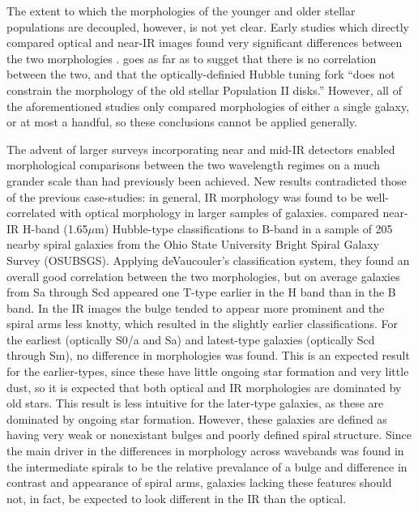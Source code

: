 The extent to which the morphologies of the younger and older stellar populations are decoupled, however, is not yet clear. Early studies which directly compared optical and near-IR images found very significant differences between the two morphologies \citep{Hackwell1983,Thronson1989,Block1991,Block1994}. \citet{Block1999} goes as far as to sugget that there is no correlation between the two, and that the optically-definied Hubble tuning fork ``does not constrain the morphology of the old stellar Population II disks.'' However, all of the aforementioned studies only compared morphologies of either a single galaxy, or at most a handful, so these conclusions cannot be applied generally.

The advent of larger surveys incorporating near and mid-IR detectors enabled morphological comparisons between the two wavelength regimes on a much grander scale than had previously been achieved. New results contradicted those of the previous case-studies: in general, IR morphology was found to be well-correlated with optical morphology in larger samples of galaxies. \citet{Eskridge2002} compared near-IR H-band (1.65$\mu$m) Hubble-type classifications to B-band in a sample of 205 nearby spiral galaxies from the Ohio State University Bright Spiral Galaxy Survey (OSUBSGS). Applying deVaucouler's classification system, they found an overall good correlation between the two morphologies, but on average galaxies from Sa through Scd appeared one T-type earlier in the H band than in the B band. In the IR images the bulge tended to appear more prominent and the spiral arms less knotty, which resulted in the slightly earlier classifications. For the earliest (optically S0/a and Sa) and latest-type galaxies (optically Scd through Sm), no difference in morphologies was found. This is an expected result for the earlier-types, since these have little ongoing star formation and very little dust, so it is expected that both optical and IR morphologies are dominated by old stars. This result is less intuitive for the later-type galaxies, as these are dominated by ongoing star formation. However, these galaxies are defined as having very weak or nonexistant bulges and poorly defined spiral structure. Since the main driver in the differences in morphology across wavebands was found in the intermediate spirals to be the relative prevalance of a bulge and difference in contrast and appearance of spiral arms, galaxies lacking these features should not, in fact, be expected to look different in the IR than the optical. 
 
